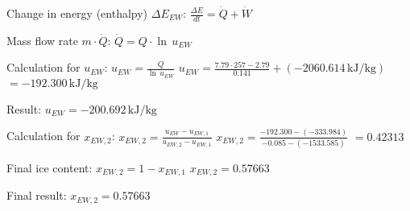 Change in energy (enthalpy) \( \Delta E_{EW} \):  
\( \frac{\Delta E}{dt} = \dot{Q} + \dot{W} \)  

Mass flow rate \( m \cdot \dot{Q} \):  
\( \dot{Q} = Q \cdot \ln \, u_{EW} \)  

Calculation for \( u_{EW} \):  
\( u_{EW} = \frac{Q}{\ln \, u_{EW}} \)  
\( u_{EW} = \frac{7.79 \cdot 257 - 2.79}{0.141} + (-2060.614 \, \text{kJ/kg}) \)  
\( = -192.300 \, \text{kJ/kg} \)  

Result:  
\( u_{EW} = -200.692 \, \text{kJ/kg} \)  

Calculation for \( x_{EW,2} \):  
\( x_{EW,2} = \frac{u_{EW} - u_{EW,1}}{u_{EW,2} - u_{EW,1}} \)  
\( x_{EW,2} = \frac{-192.300 - (-333.984)}{-0.085 - (-1533.585)} \)  
\( = 0.42313 \)  

Final ice content:  
\( x_{EW,2} = 1 - x_{EW,1} \)  
\( x_{EW,2} = 0.57663 \)  

Final result:  
\( x_{EW,2} = 0.57663 \)